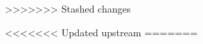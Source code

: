 \renewcommand\sectionstyle{%
    \def\activitystyle{activity-section}
    \def\maketitle{%
        \addtocounter{sectiontitlenumber}{1}
        {\flushleft\small\sffamily\bfseries\@pretitle\par\vspace{-1.5em}}%
        {\flushleft\Large\sffamily\bfseries\thetitlenumber.\thesectiontitlenumber\hspace{1em}\@title \par}%
        {\vskip .6em\noindent\textit\theabstract}%
        \par\vspace{2em}
        \phantomsection\addcontentsline{toc}{subsection}{\thetitlenumber.\thesectiontitlenumber\hspace{1em}\@title}%
        \let\section\subsubsection
        \let\subsection\subsubsubsection
    }}

\makeatother
>>>>>>> Stashed changes

<<<<<<< Updated upstream
\makeatletter
 \newcommand\handoutstyle{%
    \addtocounter{titlenumber}{1}%
    \phantomsection\addcontentsline{toc}{section}{\@date}%
        \setcounter{br}{0}}
%
%
%
=======
\newcommand{\handoutTitle}{
    \title[%
        \textnormal{\large \scshape MAT-255-- Number Theory \hfill Spring 2024 \hfill In Class Work \classday}%
        
        \textnormal{\large
        Your Name: \hrulefill \quad Group Members:\hrulefill \quad \hrulefill}%
        \vspace{-5em}]{}
    }


